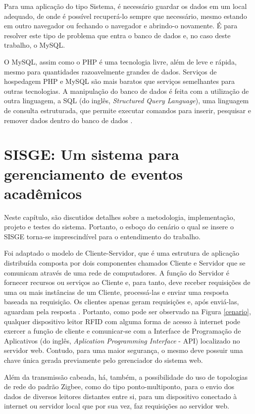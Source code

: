 \documentclass[tcc,capa]{texufpel}
\begin{document}
             Para uma aplicação do tipo Sistema, é necessário guardar os dados em um local adequado, de onde é possível recuperá-lo sempre que necessário, mesmo estando em outro navegador ou fechando o navegador e abrindo-o novamente.
            É para resolver este tipo de problema que entra o banco de dados e, no caso deste trabalho, o MySQL.
            
            O MySQL, assim como o PHP é uma tecnologia livre, além de leve e rápida, mesmo para quantidades razoavelmente grandes de dados. Serviços de hospedagem PHP e MySQL são mais baratos que serviços semelhantes para outras tecnologias.
            A manipulação do banco de dados é feita com a utilização de outra linguagem, a SQL (do inglês, \textit{Structured Query Language}), uma linguagem de consulta estruturada, que permite executar comandos para inserir, pesquisar e remover dados dentro do banco de dados \cite{thonson2005php}.

\chapter{SISGE: Um sistema para gerenciamento de eventos acadêmicos}

    Neste capítulo, são discutidos detalhes sobre a metodologia, implementação, projeto e testes do sistema.
    Portanto, o esboço do cenário o qual se insere o SISGE torna-se imprescindível para o entendimento do trabalho. 
    
    Foi adaptado o modelo de Cliente-Servidor, que é uma estrutura de aplicação distribuída composta por dois componentes chamados Cliente e Servidor que se comunicam através de uma rede de computadores. A função do Servidor é fornecer recursos ou serviços ao Cliente e, para tanto, deve receber requisições de uma ou mais instâncias de um Cliente, processá-las e enviar uma resposta baseada na requisição. Os clientes apenas geram requisições e, após enviá-las, aguardam pela resposta \cite{tanebaum2007computer}.
    Portanto, como pode ser observado na  Figura \ref{cenario}, qualquer dispositivo leitor RFID com alguma forma de acesso à internet pode exercer a função de cliente e comunicar-se com a Interface de Programação de Aplicativos (do inglês, \textit{Aplication Programming Interface} - API) localizado no servidor web. Contudo, para uma maior segurança, o mesmo deve possuir uma chave única gerada previamente pelo gerenciador do sistema web.
    
    
    Além da transmissão cabeada, há, também, a possibilidade do uso de topologias de rede do padrão Zigbee, como do tipo ponto-multiponto, para o envio dos dados de diversos leitores distantes entre si, para um dispositivo conectado à internet ou servidor local que por sua vez, faz requisições ao servidor web.
    
\end{document}
